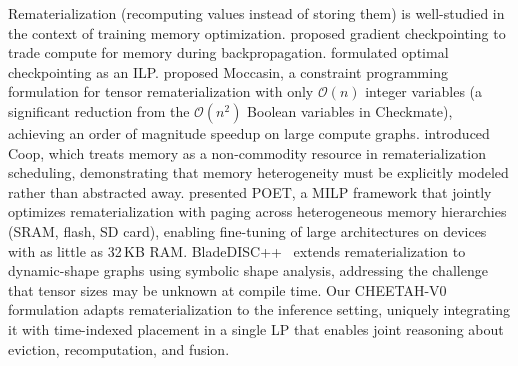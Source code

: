 Rematerialization (recomputing values instead of storing them) is well-studied in the context of training memory optimization.
\citep{chen2016trainingdeepnetssublinear} proposed gradient checkpointing to trade compute for memory during backpropagation.
\citep{jain2020checkmatebreakingmemorywall} formulated optimal checkpointing as an ILP. \citep{bartan2023moccasinefficienttensorrematerialization} proposed Moccasin, a constraint programming formulation for tensor rematerialization with only $\mathcal{O}(n)$ integer variables (a significant reduction from the $\mathcal{O}(n^2)$ Boolean variables in Checkmate), achieving an order of magnitude speedup on large compute graphs.  \cite{zhang2023coopmemorycommodity} introduced Coop, which treats memory as a non-commodity resource in rematerialization scheduling, demonstrating that memory heterogeneity must be explicitly modeled rather than abstracted away. \citep{patil2022poettrainingneuralnetworks} presented POET, a MILP framework that jointly optimizes rematerialization with paging across heterogeneous memory hierarchies (SRAM, flash, SD card), enabling fine-tuning of large architectures on devices with as little as 32\,KB RAM. BladeDISC++~\citep{yuan2024bladediscmemoryoptimizationsbased} extends rematerialization to dynamic-shape graphs using symbolic shape analysis, addressing the challenge that tensor sizes may be unknown at compile time. 
Our CHEETAH-V0 formulation adapts rematerialization to the inference setting, uniquely integrating it with time-indexed placement in a single LP that enables joint reasoning about eviction, recomputation, and fusion.

